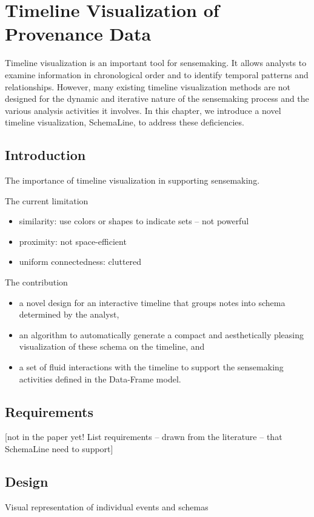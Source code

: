 \chapter{Timeline Visualization of Provenance Data}

\graphicspath{{Chapter3/figures/}}

Timeline visualization is an important tool for sensemaking. It allows analysts to examine information in chronological order and to identify temporal patterns and relationships. However, many existing timeline visualization methods are not designed for the dynamic and iterative nature of the sensemaking process and the various analysis activities it involves. In this chapter, we introduce a novel timeline visualization, SchemaLine, to address these deficiencies.

\section{Introduction}
The importance of timeline visualization in supporting sensemaking.

The current limitation
\begin{itemize}
	\item similarity: use colors or shapes to indicate sets -- not powerful 
	\item proximity: not space-efficient
	\item uniform connectedness: cluttered
\end{itemize} 

The contribution
\begin{itemize}
	\item a novel  design for an interactive timeline that groups notes into schema determined by the analyst,
	\item an algorithm to automatically generate a compact and aesthetically pleasing visualization of these schema on the timeline, and
	\item a set of fluid interactions with the timeline to support the sensemaking activities defined in the Data-Frame model.
\end{itemize}

\section{Requirements}
[not in the paper yet! List requirements -- drawn from the literature -- that SchemaLine need to support]

\section{Design}
Visual representation of individual events and schemas

